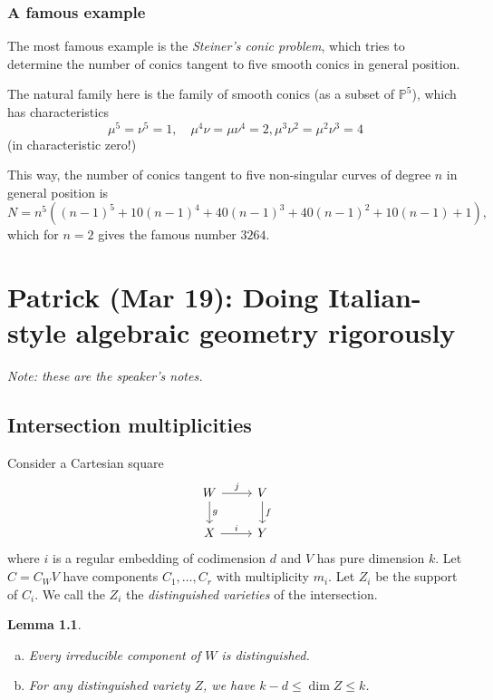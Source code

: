 \documentclass[leqno, openany]{memoir}
\newtheorem{lem}[thm]{Lemma}
\theoremstyle{definition}
\theoremstyle{remark}
\theoremstyle{plain}
\theoremstyle{definition}
\theoremstyle{remark}
\renewcommand{\P}{\mathbb{P}}
\begin{document}
\subsection{A famous example}%
\label{sub:a_famous_example}

The most famous example is the \emph{Steiner's conic problem}, which tries to determine the number of conics tangent to five smooth conics in general position. 

The natural family here is the family of smooth conics (as a subset of $\P^5$), which has characteristics
\[ \mu^5=\nu^5=1, \quad \mu^4\nu=\mu\nu^4=2, \mu^3\nu^2=\mu^2\nu^3=4 \]
(in characteristic zero!)

This way, the number of conics tangent to five non-singular curves of degree $n$ in general position is
\[ N=n^5({ (n-1) }^5+10{ (n-1) }^4+40{ (n-1) }^3+40{ (n-1) }^2+10(n-1)+1), \]
which for $n=2$ gives the famous number $3264$. 

\chapter{Patrick (Mar 19): Doing Italian-style algebraic geometry rigorously}%
\label{cha:patrick_mar_19_doing_italian_style_algebraic_geometry_rigorously}

\textit{Note: these are the speaker's notes.} 

\section{Intersection multiplicities}%
\label{sec:intersection_multiplicities}

Consider a Cartesian square
\begin{equation*}
\begin{tikzcd}
    W \ar{r}{j} \ar{d}{g} & V \ar{d}{f} \\
    X \ar{r}{i} & Y
\end{tikzcd}
\end{equation*}
where $i$ is a regular embedding of codimension $d$ and $V$ has pure dimension $k$. Let $C = C_W V$ have components $C_1, \ldots, C_r$ with multiplicity $m_i$. Let $Z_i$ be the support of $C_i$. We call the $Z_i$ the \textit{distinguished varieties} of the intersection.

\begin{lem}\leavevmode
    \begin{enumerate}[(a)]
        \item Every irreducible component of $W$ is distinguished.
        \item For any distinguished variety $Z$, we have $k-d \leq \dim Z \leq k$.
    \end{enumerate}
\end{lem}
\end{document}
